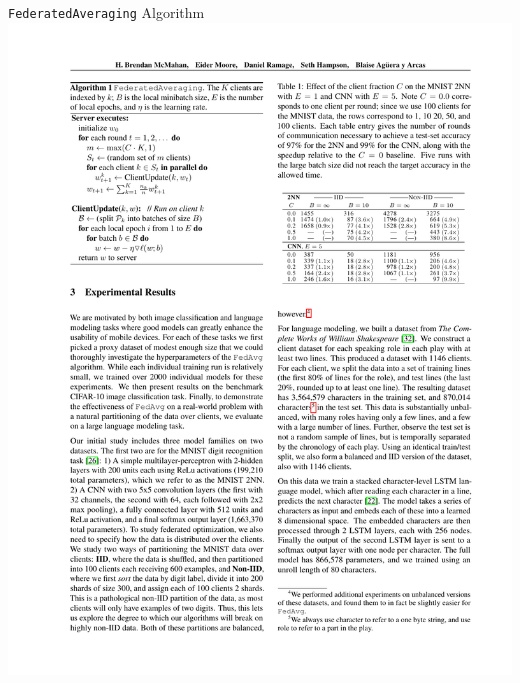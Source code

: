 \documentclass{beamer}{}
\begin{document}
    \begin{frame} {\texttt{FederatedAveraging} Algorithm}
        \center\includegraphics[height=.6\textheight]{img/fedavg.pdf}
    \end{frame}
    \begin{frame}[plain]
    \end{frame}
\end{document}
